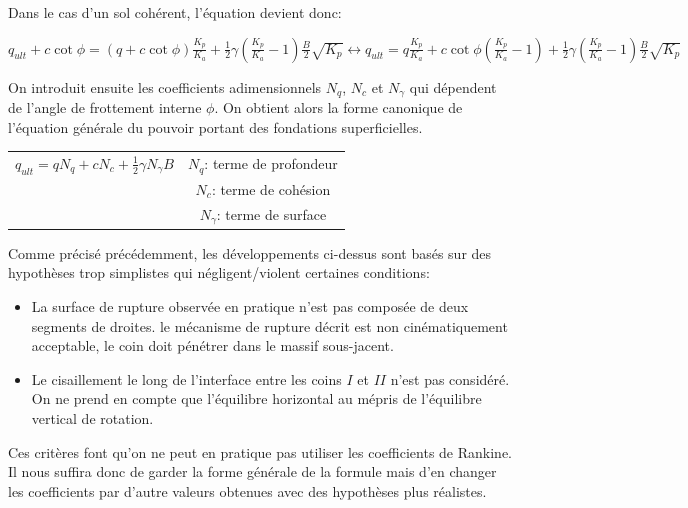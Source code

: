         Dans le cas d'un sol cohérent, l'équation devient donc:
        
        \begin{center}
            $q_{ult} + c \cot \phi = (q + c \cot \phi) \frac{K_p}{K_a} + \frac{1}{2}\gamma(\frac{K_p}{K_a} - 1) \frac{B}{2} \sqrt{K_p} \leftrightarrow q_{ult} = q \frac{K_p}{K_a} + c \cot \phi (\frac{K_p}{K_a} - 1) + \frac{1}{2} \gamma (\frac{K_p}{K_a}-1) \frac{B}{2} \sqrt{K_p}$
        \end{center} 
        
        On introduit ensuite les coefficients adimensionnels $N_q$, $N_c$ et $N_{\gamma}$ qui dépendent de l'angle de frottement interne $\phi$. On obtient alors la forme canonique de l'équation générale du pouvoir portant des fondations superficielles.
        
        \begin{center}
            \begin{tabular}{c|c}
                 $q_{ult} = qN_q + cN_c + \frac{1}{2} \gamma N_{\gamma}B$ 
                    &  $N_q$: terme de profondeur  \\
                    &  $N_c$: terme de cohésion  \\
                    &  $N_{\gamma}$: terme de surface 
            \end{tabular}
        \end{center} 
        
        Comme précisé précédemment, les développements ci-dessus sont basés sur des hypothèses trop simplistes qui négligent/violent certaines conditions:
        \begin{itemize}
            \item La surface de rupture observée en pratique n'est pas composée de deux segments de droites. le mécanisme de rupture décrit est non cinématiquement acceptable, le coin doit pénétrer dans le massif sous-jacent.
            \item Le cisaillement le long de l'interface entre les coins $I$ et $II$ n'est pas considéré. On ne prend en compte que l'équilibre horizontal au mépris de l'équilibre vertical de rotation.
        \end{itemize} 
        
        Ces critères font qu'on ne peut en pratique pas utiliser les coefficients de Rankine. Il nous suffira donc de garder la forme générale de la formule mais d'en changer les coefficients par d'autre valeurs obtenues avec des hypothèses plus réalistes.
        
